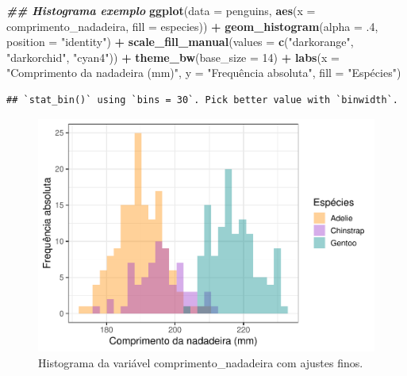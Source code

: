 \documentclass[
]{article}
\newenvironment{Shaded}{\begin{snugshade}}{\end{snugshade}}
\newcommand{\AttributeTok}[1]{\textcolor[rgb]{0.13,0.29,0.53}{#1}}
\newcommand{\DecValTok}[1]{\textcolor[rgb]{0.00,0.00,0.81}{#1}}
\newcommand{\DocumentationTok}[1]{\textcolor[rgb]{0.56,0.35,0.01}{\textbf{\textit{#1}}}}
\newcommand{\FunctionTok}[1]{\textcolor[rgb]{0.13,0.29,0.53}{\textbf{#1}}}
\newcommand{\NormalTok}[1]{#1}
\newcommand{\SpecialCharTok}[1]{\textcolor[rgb]{0.81,0.36,0.00}{\textbf{#1}}}
\newcommand{\StringTok}[1]{\textcolor[rgb]{0.31,0.60,0.02}{#1}}
\begin{document}
\begin{Shaded}
\begin{Highlighting}[]
\DocumentationTok{\#\# Histograma exemplo}
\FunctionTok{ggplot}\NormalTok{(}\AttributeTok{data =}\NormalTok{ penguins, }\FunctionTok{aes}\NormalTok{(}\AttributeTok{x =}\NormalTok{ comprimento\_nadadeira, }\AttributeTok{fill =}\NormalTok{ especies)) }\SpecialCharTok{+}
    \FunctionTok{geom\_histogram}\NormalTok{(}\AttributeTok{alpha =}\NormalTok{ .}\DecValTok{4}\NormalTok{, }\AttributeTok{position =} \StringTok{"identity"}\NormalTok{) }\SpecialCharTok{+}
    \FunctionTok{scale\_fill\_manual}\NormalTok{(}\AttributeTok{values =} \FunctionTok{c}\NormalTok{(}\StringTok{"darkorange"}\NormalTok{, }\StringTok{"darkorchid"}\NormalTok{, }\StringTok{"cyan4"}\NormalTok{)) }\SpecialCharTok{+}
    \FunctionTok{theme\_bw}\NormalTok{(}\AttributeTok{base\_size =} \DecValTok{14}\NormalTok{) }\SpecialCharTok{+}
    \FunctionTok{labs}\NormalTok{(}\AttributeTok{x =} \StringTok{"Comprimento da nadadeira (mm)"}\NormalTok{, }
         \AttributeTok{y =} \StringTok{"Frequência absoluta"}\NormalTok{, }\AttributeTok{fill =} \StringTok{"Espécies"}\NormalTok{)}
\end{Highlighting}
\end{Shaded}

\begin{verbatim}
## `stat_bin()` using `bins = 30`. Pick better value with `binwidth`.
\end{verbatim}

\begin{figure}

{\centering \includegraphics[width=0.75\linewidth,height=0.75\textheight]{epr_files/figure-latex/fig-hist-fino-1} 

}

\caption{Histograma da variável comprimento_nadadeira com ajustes finos.}\label{fig:fig-hist-fino}
\end{figure}
\end{document}
